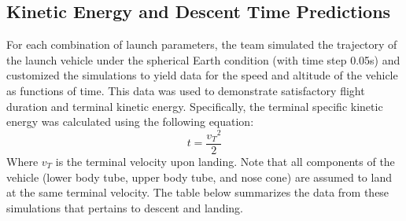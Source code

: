 \subsection{Kinetic Energy and Descent Time Predictions}
For each combination of launch parameters, the team simulated the trajectory of the launch vehicle under the spherical Earth condition (with time step 0.05s) and customized the simulations to yield data for the speed and altitude of the vehicle as functions of time. This data was used to demonstrate satisfactory flight duration and terminal kinetic energy. Specifically, the terminal specific kinetic energy was calculated using the following equation:
\begin{equation}
        t = \frac{v{_T}^2}{2}
\end{equation}
Where $v{_T}$ is the terminal velocity upon landing. Note that all components of the vehicle (lower body tube, upper body tube, and nose cone) are assumed to land at the same terminal velocity. The table below summarizes the data from these simulations that pertains to descent and landing.

